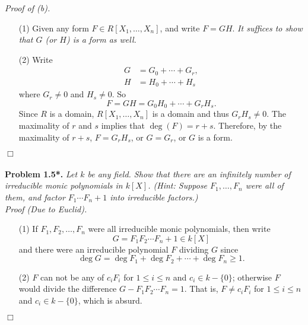 \documentclass{article}
\begin{document}
\emph{Proof of (b).}
\begin{enumerate}
\item[(1)]
  Given any form $F \in R[X_1,\ldots,X_n]$, and write $F = GH$.
  \emph{It suffices to show that $G$ (or $H$) is a form as well.}

\item[(2)]
  Write
  \begin{align*}
    G &= G_0+\cdots+G_r, \\
    H &= H_0+\cdots+H_s
  \end{align*}
  where $G_r \neq 0$ and $H_s \neq 0$.
  So
  \[
    F = GH = G_0H_0 + \cdots + G_r H_s.
  \]
  Since $R$ is a domain, $R[X_1,\ldots,X_n]$ is a domain and thus $G_r H_s \neq 0$.
  The maximality of $r$ and $s$ implies that $\deg(F) = r+s$.
  Therefore, by the maximality of $r+s$,
  $F = G_r H_s$, or $G = G_r$, or $G$ is a form.
\end{enumerate}
$\Box$\\\\






\textbf{Problem 1.5*.}
\emph{Let $k$ be any field.
Show that there are an infinitely number of irreducible monic polynomials in $k[X]$.
(Hint: Suppose $F_1,\ldots,F_n$ were all of them, and factor $F_1\cdots F_n+1$ into irreducible factors.)} \\

\emph{Proof (Due to Euclid).}
\begin{enumerate}
\item[(1)]
  If
  $F_1, F_2, \ldots, F_n$ were all irreducible monic polynomials, then
  write
  \[
    G = F_1 F_2 \cdots F_n + 1 \in k[X]
  \]
  and there were an irreducible polynomial $F$ dividing $G$
  since
  \[
    \deg G = \deg F_1 + \deg F_2 + \cdots + \deg F_n \geq 1.
  \]

\item[(2)]
  $F$ can not be any of $c_i F_i$ for $1 \leq i \leq n$ and $c_i \in k - \{0\}$;
  otherwise $F$ would divide the difference $G - F_1 F_2 \cdots F_n = 1$.
  That is, $F \neq c_i F_i$ for $1 \leq i \leq n$ and $c_i \in k - \{0\}$,
  which is absurd.
\end{enumerate}
$\Box$\\\\



\end{document}
